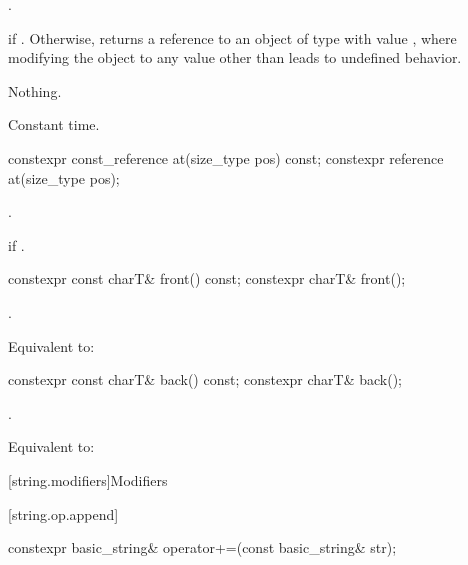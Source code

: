 \begin{itemdescr}
\pnum
\expects
{}.

\pnum
\returns
{} if . Otherwise,
returns a reference to an object of type  with value
, where modifying the object to any value other than
 leads to undefined behavior.

\pnum
\throws
Nothing.

\pnum
\complexity
Constant time.
\end{itemdescr}

%
\begin{itemdecl}
constexpr const_reference at(size_type pos) const;
constexpr reference       at(size_type pos);
\end{itemdecl}

\begin{itemdescr}
\pnum
\returns
{}.

\pnum
\throws
{}
if
.
\end{itemdescr}

%
\begin{itemdecl}
constexpr const charT& front() const;
constexpr charT& front();
\end{itemdecl}

\begin{itemdescr}
\pnum
\expects
{}.

\pnum
\effects
Equivalent to: 
\end{itemdescr}

%
\begin{itemdecl}
constexpr const charT& back() const;
constexpr charT& back();
\end{itemdecl}

\begin{itemdescr}
\pnum
\expects
{}.

\pnum
\effects
Equivalent to: 
\end{itemdescr}

[string.modifiers]{Modifiers}

[string.op.append]{}

%
\begin{itemdecl}
constexpr basic_string& operator+=(const basic_string& str);
\end{itemdecl}

